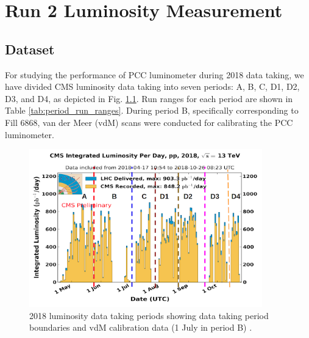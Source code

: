 \chapter{Run 2 Luminosity Measurement}  %

\ifpdf
    \graphicspath{{Chapter4/Figs/Raster/}{Chapter4/Figs/PDF/}{Chapter4/Figs/}}
\else
    \graphicspath{{Chapter4/Figs/Vector/}{Chapter4/Figs/}}
\fi




\section{Dataset}

For studying the performance of PCC luminometer during 2018 data taking, we have divided CMS luminosity data taking into seven periods: A, B, C, D1, D2, D3, and D4, as depicted in %
Fig. \ref{fig:period_bound}. Run ranges for each period are shown in Table \ref{tab:period_run_ranges}.
During period B, specifically corresponding to Fill 6868, van der Meer (vdM) scans were conducted for calibrating the PCC luminometer.

\begin{figure}[!htp]
\centering
\includegraphics[width=0.9\textwidth]{ashish_thesis/period_boundary.png}
\caption[2018 CMS Luminosity Data Period]{%
   2018 luminosity data taking periods showing data taking period boundaries and vdM calibration data (1 July in period B)  \cite{CERNLumiPublicResults}.
}
\label{fig:period_bound}
\end{figure}


